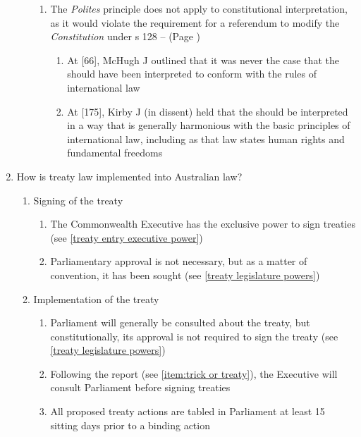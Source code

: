 \begin{enumerate}
\begin{enumerate}
\begin{enumerate}
            \item The \textit{Polites} principle does not apply to constitutional interpretation, as it would violate the requirement for a referendum to modify the \textit{Constitution} under s 128 --  (Page \pageref{case:Al-Kateb v Godwin})
            \begin{enumerate}
                \item At [66], McHugh J outlined that it was never the case that the  should have been interpreted to conform with the rules of international law
                \item At [175], Kirby J (in dissent) held that the  should be interpreted in a way that is generally harmonious with the basic principles of international law, including as that law states human rights and fundamental freedoms
            \end{enumerate}
        \end{enumerate}
    \end{enumerate}
    \item How is treaty law implemented into Australian law?
    \begin{enumerate}
        \item Signing of the treaty
        \begin{enumerate}
            \item The Commonwealth Executive has the exclusive power to sign treaties (see \ref{treaty entry executive power})
            \item Parliamentary approval is not necessary, but as a matter of convention, it has been sought (see \ref{treaty legislature powers})
        \end{enumerate}
        \item Implementation of the treaty
        \begin{enumerate}
            \item Parliament will generally be consulted about the treaty, but constitutionally, its approval is not required to sign the treaty (see \ref{treaty legislature powers})
            \item Following the  report (see \ref{item:trick or treaty}), the Executive will consult Parliament before signing treaties
            \item All proposed treaty actions are tabled in Parliament at least 15 sitting days prior to a binding action

\end{enumerate}
\end{enumerate}
\end{enumerate}
